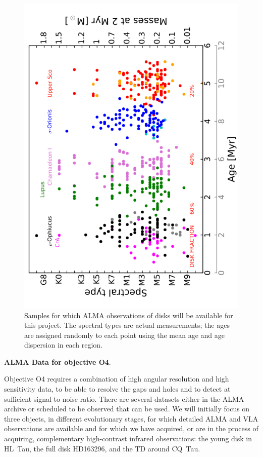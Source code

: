 \documentclass[10pt,fleqn,twoside]{article}
\begin{document}
\begin{figure}
\includegraphics[scale=0.4,angle=-90]{f_samples_alma.pdf}
\caption{Samples for which ALMA observations of disks will be available for this project. The spectral types are actual measurements; the ages are assigned randomly to each point using the mean age and age dispersion in each region.}
\label{f_almasamp}
\end{figure}

{\bf ALMA Data for objective O4}.

Objective O4 requires a combination of high angular resolution and high sensitivity data, to be able to resolve the gaps and holes and to detect at sufficient signal to noise ratio. There are several datasets either in the ALMA archive or scheduled to be observed that can be used. We will initially focus on three objects, in different evolutionary stages, for which detailed ALMA and VLA observations are available and for which we have acquired, or are in the process of acquiring, complementary high-contrast infrared observations: the young disk in HL~Tau, the full disk HD163296, and the TD around CQ~Tau.
\end{document}

